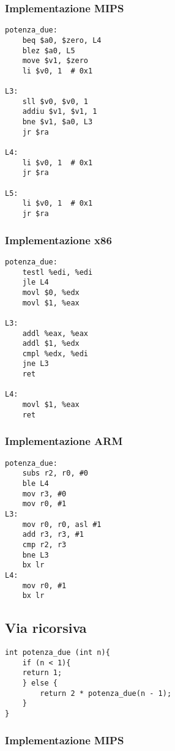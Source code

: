 \documentclass[class=book, crop=false, oneside]{standalone}
\begin{document}
\subsubsection{Implementazione MIPS}

\begin{verbatim}
potenza_due:
	beq $a0, $zero, L4
	blez $a0, L5
	move $v1, $zero
	li $v0, 1  # 0x1

L3:
	sll $v0, $v0, 1
	addiu $v1, $v1, 1
	bne $v1, $a0, L3
	jr $ra

L4:
	li $v0, 1  # 0x1
	jr $ra

L5:
	li $v0, 1  # 0x1
	jr $ra
\end{verbatim}

\subsubsection{Implementazione x86}

\begin{verbatim}
potenza_due:
	testl %edi, %edi
	jle L4
	movl $0, %edx
	movl $1, %eax

L3:
	addl %eax, %eax
	addl $1, %edx
	cmpl %edx, %edi
	jne L3
	ret

L4:
	movl $1, %eax
	ret
\end{verbatim}

\subsubsection{Implementazione ARM}

\begin{verbatim}
potenza_due:
	subs r2, r0, #0
	ble L4
	mov r3, #0
	mov r0, #1
L3:
	mov r0, r0, asl #1
	add r3, r3, #1
	cmp r2, r3
	bne L3
	bx lr
L4:
	mov r0, #1
	bx lr
\end{verbatim}

\subsection*{Via ricorsiva}

\begin{verbatim}
int potenza_due (int n){
	if (n < 1){
	return 1;
	} else {
		return 2 * potenza_due(n - 1);
	}
}
\end{verbatim}

\subsubsection{Implementazione MIPS}
\end{document}
